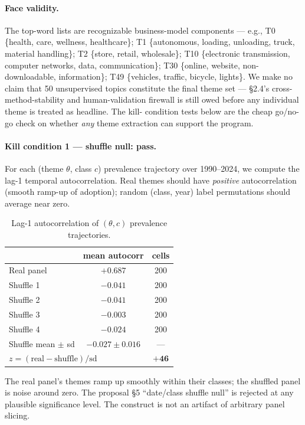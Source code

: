 \documentclass[11pt]{article}
\begin{document}
\paragraph{Face validity.} The top-word lists are recognizable business-model
components --- e.g., T0 \{health, care, wellness, healthcare\}; T1 \{autonomous,
loading, unloading, truck, material handling\}; T2 \{store, retail, wholesale\};
T10 \{electronic transmission, computer networks, data, communication\}; T30
\{online, website, non-downloadable, information\}; T49 \{vehicles, traffic,
bicycle, lights\}. We make no claim that 50 unsupervised topics constitute the
final theme set --- §2.4's cross-method-stability and human-validation firewall
is still owed before any individual theme is treated as headline. The kill-
condition tests below are the cheap go/no-go check on whether \emph{any} theme
extraction can support the program.

\paragraph{Kill condition 1 --- shuffle null: pass.}
For each (theme $\theta$, class $c$) prevalence trajectory over 1990--2024, we
compute the lag-1 temporal autocorrelation. Real themes should have
\emph{positive} autocorrelation (smooth ramp-up of adoption); random
(class, year) label permutations should average near zero.

\begin{table}[h]\centering\small
\caption{Lag-1 autocorrelation of $(\theta, c)$ prevalence trajectories.}
\begin{tabular}{lcc}
\toprule
& mean autocorr & cells \\
\midrule
Real panel & $+0.687$ & 200 \\
Shuffle 1 & $-0.041$ & 200 \\
Shuffle 2 & $-0.041$ & 200 \\
Shuffle 3 & $-0.003$ & 200 \\
Shuffle 4 & $-0.024$ & 200 \\
\midrule
Shuffle mean $\pm$ sd & $-0.027 \pm 0.016$ & --- \\
\multicolumn{2}{l}{$z = (\text{real} - \text{shuffle})/\text{sd}$} & $\mathbf{+46}$ \\
\bottomrule
\end{tabular}
\end{table}

\noindent The real panel's themes ramp up smoothly within their classes; the
shuffled panel is noise around zero. The proposal §5 ``date/class shuffle null''
is rejected at any plausible significance level. The construct is not an
artifact of arbitrary panel slicing.
\end{document}
